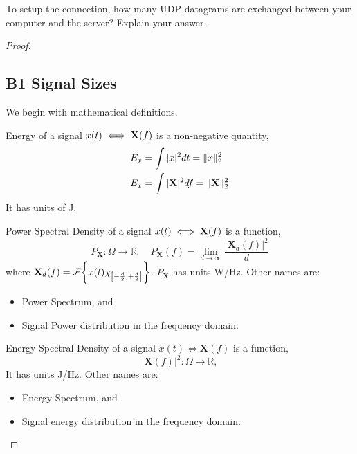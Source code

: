 \documentclass[../../main.tex]{subfiles}
\begin{document}
\begin{wts}
To setup the connection, how many UDP datagrams are exchanged between your computer and the server? Explain your answer.
\end{wts}
\begin{proof}

\newcommand{\pxf}{P_{\mathbf{X}}(f)}
\newcommand{\pyf}{P_{\mathbf{y}}(f)}
\newcommand{\hf}{\mathbf{H}(f)}
\newcommand{\xf}{\mathbf{X}(f)}
\newcommand{\yf}{\mathbf{Y}(f)}
\subsection*{B1 Signal Sizes}
We begin with mathematical definitions.
\begin{definition}
    Energy of a signal $x(t)\iff \bf{X}(f)$ is a non-negative quantity,
    \begin{align*}
        E_x&=\int |x|^2dt = \norm{x}_2^2\\
        E_x&= \int |\bf{X}|^2df = \norm{\bf{X}}_2^2
    \end{align*}
    It has units of J.
\end{definition}
\begin{definition}
    Power Spectral Density of a signal $x(t)\iff \bf{X}(f)$ is a function,
    \[
    P_{\mathbf{X}}:\Omega\to\mathbb{R},\quad P_{\mathbf{X}} (f) = \lim_{d\to\infty} \dfrac{|\mathbf{X}_d (f)|^2}{d}
    \]
    where $\mathbf{X}_d (f) = \cal{F}\biggl\{x(t)\chi_{\left[-\frac{d}{2},+\frac{d}{2}\right]}\biggr\}$. $P_{\mathbf{X}}$ has units W/Hz. Other names are:
    \begin{itemize}
        \item Power Spectrum, and
        \item Signal Power distribution in the frequency domain.
    \end{itemize}
\end{definition}
\begin{definition}
    Energy Spectral Density of a signal $x(t)\iff \mathbf{X}(f)$ is a function,
    \[
    |\mathbf{X}(f)|^2: \Omega\to\mathbb{R},
    \]
    It has units J/Hz. Other names are:
    \begin{itemize}
        \item Energy Spectrum, and
        \item Signal energy distribution in the frequency domain.
    \end{itemize}
\end{definition}
\begin{definition}

\end{definition}
\end{proof}
\end{document}
